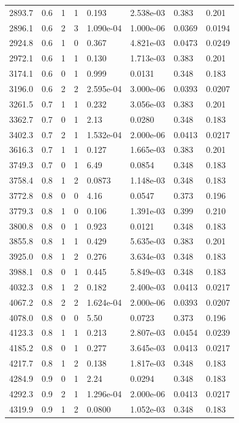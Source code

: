\documentclass[preview]{standalone}
\begin{document}
{{{\begin{tabular}{L{1.2cm}C{1.2cm} C{0.3cm}C{0.5cm} C{1.4cm}C{1.4cm} C{1.4cm}C{1.4cm}}
  2893.7  &   0.6  & 1     &  1 &  0.193  & 2.538e-03  & 0.383 &  0.201   \\ 
  2896.1  &   0.6  & 2     &  3 &  1.090e-04  & 1.000e-06  & 0.0369 &  0.0194   \\ 
  2924.8  &   0.6  & 1     &  0 &  0.367  & 4.821e-03  & 0.0473 &  0.0249   \\ 
  2972.1  &   0.6  & 1     &  1 &  0.130  & 1.713e-03  & 0.383 &  0.201   \\ 
  3174.1  &   0.6  & 0     &  1 &  0.999  & 0.0131  & 0.348 &  0.183   \\ 
  3196.0  &   0.6  & 2     &  2 &  2.595e-04  & 3.000e-06  & 0.0393 &  0.0207   \\ 
  3261.5  &   0.7  & 1     &  1 &  0.232  & 3.056e-03  & 0.383 &  0.201   \\ 
  3362.7  &   0.7  & 0     &  1 &  2.13  & 0.0280  & 0.348 &  0.183   \\ 
  3402.3  &   0.7  & 2     &  1 &  1.532e-04  & 2.000e-06  & 0.0413 &  0.0217   \\ 
  3616.3  &   0.7  & 1     &  1 &  0.127  & 1.665e-03  & 0.383 &  0.201   \\ 
  3749.3  &   0.7  & 0     &  1 &  6.49  & 0.0854  & 0.348 &  0.183   \\ 
  3758.4  &   0.8  & 1     &  2 &  0.0873  & 1.148e-03  & 0.348 &  0.183   \\ 
  3772.8  &   0.8  & 0     &  0 &  4.16  & 0.0547  & 0.373 &  0.196   \\ 
  3779.3  &   0.8  & 1     &  0 &  0.106  & 1.391e-03  & 0.399 &  0.210   \\ 
  3800.8  &   0.8  & 0     &  1 &  0.923  & 0.0121  & 0.348 &  0.183   \\ 
  3855.8  &   0.8  & 1     &  1 &  0.429  & 5.635e-03  & 0.383 &  0.201   \\ 
  3925.0  &   0.8  & 1     &  2 &  0.276  & 3.634e-03  & 0.348 &  0.183   \\ 
  3988.1  &   0.8  & 0     &  1 &  0.445  & 5.849e-03  & 0.348 &  0.183   \\ 
  4032.3  &   0.8  & 1     &  2 &  0.182  & 2.400e-03  & 0.0413 &  0.0217   \\ 
  4067.2  &   0.8  & 2     &  2 &  1.624e-04  & 2.000e-06  & 0.0393 &  0.0207   \\ 
  4078.0  &   0.8  & 0     &  0 &  5.50  & 0.0723  & 0.373 &  0.196   \\ 
  4123.3  &   0.8  & 1     &  1 &  0.213  & 2.807e-03  & 0.0454 &  0.0239   \\ 
  4185.2  &   0.8  & 0     &  1 &  0.277  & 3.645e-03  & 0.0413 &  0.0217   \\ 
  4217.7  &   0.8  & 1     &  2 &  0.138  & 1.817e-03  & 0.348 &  0.183   \\ 
  4284.9  &   0.9  & 0     &  1 &  2.24  & 0.0294  & 0.348 &  0.183   \\ 
  4292.3  &   0.9  & 2     &  1 &  1.296e-04  & 2.000e-06  & 0.0413 &  0.0217   \\ 
  4319.9  &   0.9  & 1     &  2 &  0.0800  & 1.052e-03  & 0.348 &  0.183   \\ 
\hline 
\end{tabular} 

}}}
\end{document}
